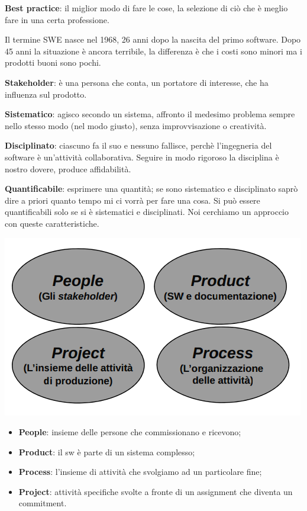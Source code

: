 \textbf{Best practice}: il miglior modo di fare le cose, la selezione di ciò che è meglio fare in una certa professione.

Il termine SWE nasce nel 1968, 26 anni dopo la nascita del primo software. Dopo 45 anni la situazione è ancora terribile, la differenza è che i costi sono minori ma i prodotti buoni sono pochi.

\textbf{Stakeholder}: è una persona che conta, un portatore di interesse, che ha influenza sul prodotto.


\textbf{Sistematico}: agisco secondo un sistema, affronto il medesimo problema sempre nello stesso modo (nel modo giusto), senza improvvisazione o creatività.

\textbf{Disciplinato}: ciascuno fa il suo e nessuno fallisce, perchè l'ingegneria del software è un'attività collaborativa. Seguire in modo rigoroso la disciplina è nostro dovere, produce affidabilità.

\textbf{Quantificabile}: esprimere una quantità; se sono sistematico e disciplinato saprò dire a priori quanto tempo mi ci vorrà per fare una cosa. Si può essere quantificabili solo se si è sistematici e disciplinati. Noi cerchiamo un approccio con queste caratteristiche.

\begin{center}

\includegraphics[width=0.75\columnwidth]{img1} %

\end{center}

\begin{itemize}

	\item \textbf{People}: insieme delle persone che commissionano e ricevono;

	\item \textbf{Product}: il sw è parte di un sistema complesso;

	\item \textbf{Process}: l'insieme di attività che svolgiamo ad un particolare fine;

	\item \textbf{Project}: attività specifiche svolte a fronte di un assignment che diventa un commitment.

\end{itemize}


